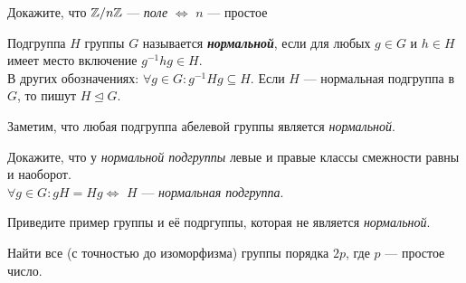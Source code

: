 \documentclass{article}
\begin{document}
\begin{task_boxed}
	Докажите, что $\mathbb{Z}/n\mathbb{Z}$ --- \textit{поле} $\Longleftrightarrow$ $n$ --- простое
\end{task_boxed}

\begin{definition_boxed}
	Подгруппа $H$ группы $G$ называется \textbf{\textit{нормальной}}, если для любых $g \in G$ и $h \in H$ имеет место включение $g^{-1}h g \in H$.\\
	В других обозначениях: $\forall g \in G : g^{-1}Hg \subseteq H$. Если $H$ — нормальная подгруппа в $G$, то пишут $H \trianglelefteq G$.
\end{definition_boxed}

\begin{example}
	Заметим, что любая подгруппа абелевой группы является \textit{нормальной}.
\end{example}

\begin{task_boxed}
	Докажите, что у \textit{нормальной подгруппы} левые и правые классы смежности равны и наоборот.\\
	$\forall g \in G: gH = Hg \Longleftrightarrow$ $H$ --- \textit{нормальная подгруппа}.
\end{task_boxed}

\begin{task_boxed}
	Приведите пример группы и её подргуппы, которая не является \textit{нормальной}.
\end{task_boxed}

\begin{task_boxed}[ *]
	Найти все (с точностью до изоморфизма) группы порядка $2p$, где $p$ — простое число.
\end{task_boxed}
\end{document}
